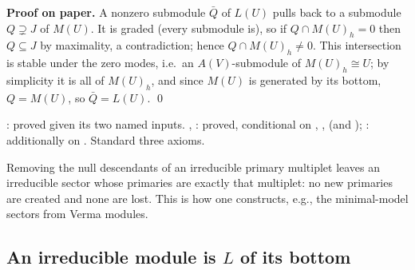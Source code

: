 \textbf{Proof on paper.} A nonzero submodule $\bar Q$ of $L(U)$ pulls back to a submodule $Q\supsetneq J$ of $M(U)$. It is graded
(every submodule is), so if $Q\cap M(U)_h = 0$ then $Q\subseteq J$ by maximality, a contradiction; hence $Q\cap M(U)_h\neq0$. This
intersection is stable under the zero modes, i.e.\ an $A(V)$-submodule of $M(U)_h\cong U$; by simplicity it is all of $M(U)_h$, and
since $M(U)$ is generated by its bottom, $Q = M(U)$, so $\bar Q = L(U)$. \qed

\begin{status}
: proved given its two named inputs. , : proved, conditional on
, ,  (and ); : additionally on . Standard three
axioms.
\end{status}

\begin{physics}
Removing the null descendants of an irreducible primary multiplet leaves an irreducible sector whose primaries are exactly that
multiplet: no new primaries are created and none are lost. This is how one constructs, e.g., the minimal-model sectors from
Verma modules.
\end{physics}

\subsection{An irreducible module is \texorpdfstring{$L$}{L} of its bottom}

